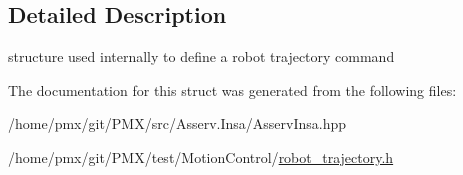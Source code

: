 \subsection{Detailed Description}
structure used internally to define a robot trajectory command 

The documentation for this struct was generated from the following files\+:\begin{DoxyCompactItemize}
\item 
/home/pmx/git/\+P\+M\+X/src/\+Asserv.\+Insa/Asserv\+Insa.\+hpp\item 
/home/pmx/git/\+P\+M\+X/test/\+Motion\+Control/\hyperlink{robot__trajectory_8h}{robot\+\_\+trajectory.\+h}\end{DoxyCompactItemize}
